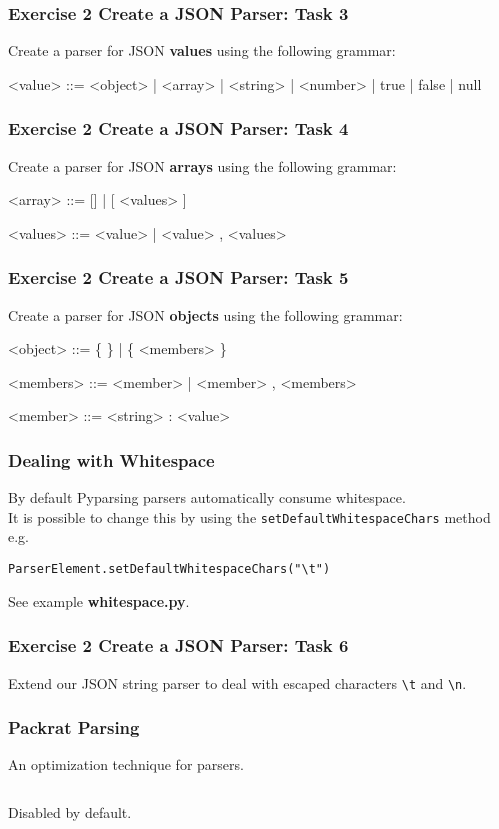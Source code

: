 \documentclass{beamer}
\newcommand*{\escape}[1]{\texttt{\textbackslash#1}}
\begin{document}
\begin{frame}[fragile]
\frametitle{Exercise 2 Create a JSON Parser: Task 3}
Create a parser for JSON \textbf{values} using the following grammar:
\medskip
\begin{grammar}
<value> ::= <object> | <array> | <string> | <number> | true | false | null
\end{grammar}
\end{frame}

\begin{frame}[fragile]
\frametitle{Exercise 2 Create a JSON Parser: Task 4}
Create a parser for JSON \textbf{arrays} using the following grammar:
\medskip
\begin{grammar}
<array> ::= [] | [ <values> ]

<values> ::= <value> | <value> , <values>
\end{grammar}
\end{frame}


\begin{frame}[fragile]
\frametitle{Exercise 2 Create a JSON Parser: Task 5}
Create a parser for JSON \textbf{objects} using the following grammar:
\medskip
\begin{grammar}
<object> ::= \{ \} | \{ <members> \}

<members> ::= <member> | <member> , <members>

<member> ::= <string> : <value>
\end{grammar}
\end{frame}


\begin{frame}[fragile]
\frametitle{Dealing with Whitespace}
By default Pyparsing parsers automatically consume whitespace. \\
\medskip
It is possible to change this by using the \texttt{setDefaultWhitespaceChars} method e.g. \\
\medskip
\begin{verbatim}
ParserElement.setDefaultWhitespaceChars("\t")
\end{verbatim}
\bigskip
See example \textbf{whitespace.py}.

\end{frame}


\begin{frame}[fragile]
\frametitle{Exercise 2 Create a JSON Parser: Task 6}
Extend our JSON string parser to deal with escaped characters \escape{t} and \escape{n}.
\end{frame}


\begin{frame}
\frametitle{Packrat Parsing}
An optimization technique for parsers. 

\begin{verbatim}

\end{verbatim}

Disabled by default.
\end{frame}
\end{document}
